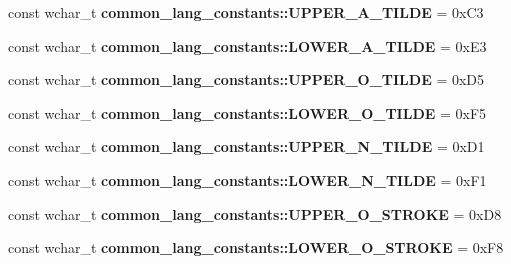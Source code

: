 \begin{DoxyCompactItemize}
\item 
\hypertarget{group___indexing_ga92ee2373651388d148d47c65660be3db}{const wchar\-\_\-t {\bfseries common\-\_\-lang\-\_\-constants\-::\-U\-P\-P\-E\-R\-\_\-\-A\-\_\-\-T\-I\-L\-D\-E} = 0x\-C3}\label{group___indexing_ga92ee2373651388d148d47c65660be3db}

\item 
\hypertarget{group___indexing_ga073c85a09786ebc50a105d6554a97bd5}{const wchar\-\_\-t {\bfseries common\-\_\-lang\-\_\-constants\-::\-L\-O\-W\-E\-R\-\_\-\-A\-\_\-\-T\-I\-L\-D\-E} = 0x\-E3}\label{group___indexing_ga073c85a09786ebc50a105d6554a97bd5}

\item 
\hypertarget{group___indexing_ga406d401a6d04ce844f6007eb5e2f46f6}{const wchar\-\_\-t {\bfseries common\-\_\-lang\-\_\-constants\-::\-U\-P\-P\-E\-R\-\_\-\-O\-\_\-\-T\-I\-L\-D\-E} = 0x\-D5}\label{group___indexing_ga406d401a6d04ce844f6007eb5e2f46f6}

\item 
\hypertarget{group___indexing_gabe9f5c39382b2de17275e3a35c749720}{const wchar\-\_\-t {\bfseries common\-\_\-lang\-\_\-constants\-::\-L\-O\-W\-E\-R\-\_\-\-O\-\_\-\-T\-I\-L\-D\-E} = 0x\-F5}\label{group___indexing_gabe9f5c39382b2de17275e3a35c749720}

\item 
\hypertarget{group___indexing_gac6633202154cda53971ff9b187c4539b}{const wchar\-\_\-t {\bfseries common\-\_\-lang\-\_\-constants\-::\-U\-P\-P\-E\-R\-\_\-\-N\-\_\-\-T\-I\-L\-D\-E} = 0x\-D1}\label{group___indexing_gac6633202154cda53971ff9b187c4539b}

\item 
\hypertarget{group___indexing_ga13c577cad7ab29919dd75858f60900e9}{const wchar\-\_\-t {\bfseries common\-\_\-lang\-\_\-constants\-::\-L\-O\-W\-E\-R\-\_\-\-N\-\_\-\-T\-I\-L\-D\-E} = 0x\-F1}\label{group___indexing_ga13c577cad7ab29919dd75858f60900e9}

\item 
\hypertarget{group___indexing_gad7c702f22e93eeffe943e6604d572f77}{const wchar\-\_\-t {\bfseries common\-\_\-lang\-\_\-constants\-::\-U\-P\-P\-E\-R\-\_\-\-O\-\_\-\-S\-T\-R\-O\-K\-E} = 0x\-D8}\label{group___indexing_gad7c702f22e93eeffe943e6604d572f77}

\item 
\hypertarget{group___indexing_ga6bf34c6706be81a04231c1d07f567ae8}{const wchar\-\_\-t {\bfseries common\-\_\-lang\-\_\-constants\-::\-L\-O\-W\-E\-R\-\_\-\-O\-\_\-\-S\-T\-R\-O\-K\-E} = 0x\-F8}\label{group___indexing_ga6bf34c6706be81a04231c1d07f567ae8}


\end{DoxyCompactItemize}
